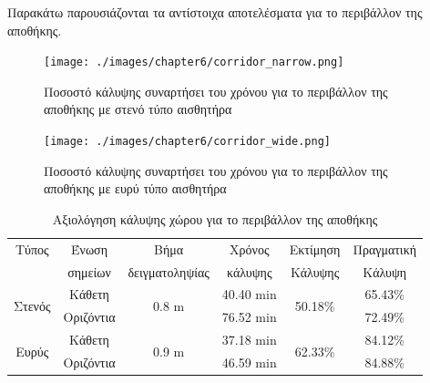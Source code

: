 Παρακάτω παρουσιάζονται τα αντίστοιχα αποτελέσματα για το περιβάλλον της αποθήκης.

\begin{figure}[!ht]
    \texttt{[image: ./images/chapter6/corridor\_narrow.png]}
    \caption{Ποσοστό κάλυψης συναρτήσει του χρόνου για το περιβάλλον της αποθήκης με στενό τύπο αισθητήρα}
     \label{fig:warehouse_narrow}
\end{figure} 

\begin{figure}[!ht]
    \texttt{[image: ./images/chapter6/corridor\_wide.png]}
    \caption{Ποσοστό κάλυψης συναρτήσει του χρόνου για το περιβάλλον της αποθήκης με ευρύ τύπο αισθητήρα}
     \label{fig:warehouse_wide}
\end{figure} 

\begin{table}[H]
    \begin{center}
        \caption{Αξιολόγηση κάλυψης χώρου για το περιβάλλον της αποθήκης}
        \label{tab:coverage_warehouse}
        \begin{tabular}{ | c | c | c | c | c | c |}
        \hline
        \rowcolor{Gray}
        Τύπος                   & Ένωση     & Βήμα                        & Χρόνος         & Εκτίμηση                 & Πραγματική \\
        \rowcolor{Gray}
                                & σημείων   & δειγματοληψίας              & κάλυψης        & Κάλυψης                  & Κάλυψη     \\
        \hline
        \multirow{2}{*}{Στενός} & Κάθετη    & \multirow{2}{*}{0.8 \si{m}} & 40.40 \si{min} & \multirow{2}{*}{50.18\%} & 65.43\%    \\
        \cline{2-2}\cline{4-4}\cline{6-6}
                                & Οριζόντια &                             & 76.52 \si{min} &                          & 72.49\%    \\
        \hline
        \multirow{2}{*}{Ευρύς} & Κάθετη     & \multirow{2}{*}{0.9 \si{m}} & 37.18 \si{min} & \multirow{2}{*}{62.33\%} & 84.12\%    \\
        \cline{2-2}\cline{4-4}\cline{6-6}
                               & Οριζόντια  &                             & 46.59 \si{min} &                          & 84.88\%    \\
        \hline
        \end{tabular}
    \end{center}
\end{table}

